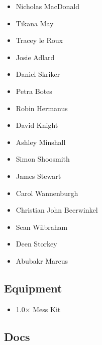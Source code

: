 \documentclass[10pt]{article}
\begin{document}
\begin{minipage}{\linewidth}
\begin{multicols}{2}
\begin{itemize}
			\item Nicholas MacDonald
			\item Tikana May
			\item Tracey le Roux
			\item Josie Adlard
			\item Daniel Skriker
			\item Petra Botes
			\item Robin Hermanus
			\item David Knight
			\item Ashley Minshall
			\item Simon Shoosmith
			\item James Stewart
			\item Carol Wannenburgh
			\item Christian John Beerwinkel
			\item Sean Wilbraham
			\item Deen Storkey
			\item Abubakr Marcus
		\end{itemize}
	\columnbreak
	\subsection*{\faWrench \: Equipment}
	
        \begin{itemize}
                    \item 1.0$\times$ \: Mess Kit
                \end{itemize}
                \vfill\null
        \subsection*{\faFile \: Docs}
     	\end{multicols}


	\vspace{1cm}
	\end{minipage}
\end{document}
